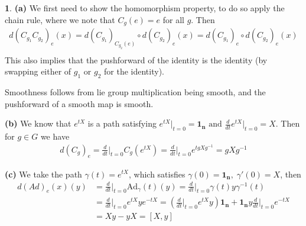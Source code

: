 \documentclass[10.5pt]{article}
\theoremstyle{definition}
\newtheorem{pb}{}
\newcommand{\tand}{\text{ and }}
\newcommand{\tor}{\text{ or }}
\begin{document}
    \begin{pb}
        \textbf{(a)} We first need to show the homomorphism property, to do so apply the chain rule, where we note that \(C_g(e) = e\) for all \(g\). Then
        \begin{align*}
            d (C_{g_1} C_{g_2})_e (x) = d(C_{g_1})_{C_{g_2}(e)} \circ d(C_{g_2})_e (x) = d(C_{g_1})_{e} \circ d(C_{g_2})_e (x) \\
        \end{align*}
        This also implies that the pushforward of the identity is the identity (by swapping either of \(g_1 \tor g_2\) for the identity).

        Smoothness follows from lie group multiplication being smooth, and the pushforward of a smooth map is smooth.

        \textbf{(b)} We know that \(e^{tX}\) is a path satisfying \(e^{tX} \vert_{t=0} = \mathbf{1_n} \tand \frac{d}{dt} e^{tX} \vert_{t=0} = X\). Then for \(g \in G\) we have
        \begin{align*}
            d(C_g)_e = \frac{d}{dt}\vert_{t=0} C_g(e^{tX}) = \frac{d}{dt}\vert_{t=0} e^{tgXg^{-1}} =  gXg^{-1}
        \end{align*}

        \textbf{(c)} We take the path \(\gamma(t) = e^{tX}\), which satisfies \(\gamma(0) = \mathbf{1_n}, \; \gamma'(0) = X\), then
        \begin{align*}
            d(Ad)_e(x)(y) &= \frac{d}{dt}\vert_{t=0} \text{Ad}_\gamma(t)(y) = \frac{d}{dt}\vert_{t=0} \gamma(t)y\gamma^{-1}(t) \\ &= \frac{d}{dt}\vert_{t=0}e^{tX}ye^{-tX}
            = \left(\frac{d}{dt}\vert_{t=0} e^{tX}y\right)\mathbf{1_n} + \mathbf{1_n}y \frac{d}{dt}\vert_{t=0} e^{-tX} \\
            &= Xy - yX = [X,y]
        \end{align*}

    \end{pb}
\end{document}

